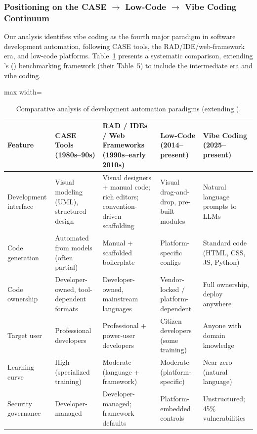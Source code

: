 \documentclass[preprint,12pt,authoryear]{elsarticle}
\begin{document}
\subsubsection{Positioning on the CASE $\rightarrow$ Low-Code $\rightarrow$ Vibe Coding Continuum}

Our analysis identifies vibe coding as the fourth major paradigm in software development automation, following CASE tools, the RAD/IDE/web-framework era, and low-code platforms. Table~\ref{tab:comparison} presents a systematic comparison, extending \citeauthor{Sanchis2020}'s (\citeyear{Sanchis2020}) benchmarking framework (their Table~5) to include the intermediate era and vibe coding.

\begin{table}[htbp]
\centering
\caption{Comparative analysis of development automation paradigms (extending \citet{Sanchis2020}).}
\label{tab:comparison}
\footnotesize
\setlength{\tabcolsep}{4pt}
\renewcommand{\arraystretch}{1.15}
\begin{adjustbox}{max width=\textwidth}
\begin{tabular}{@{}p{2.4cm}p{2.9cm}p{3.4cm}p{3.0cm}p{3.2cm}@{}}
\toprule
\textbf{Feature} & \textbf{CASE Tools (1980s--90s)} & \textbf{RAD / IDEs / Web Frameworks (1990s--early 2010s)} & \textbf{Low-Code (2014--present)} & \textbf{Vibe Coding (2025--present)} \\
\midrule
Development interface & Visual modeling (UML), structured design & Visual designers + manual code; rich editors; convention-driven scaffolding & Visual drag-and-drop, pre-built modules & Natural language prompts to LLMs \\
Code generation & Automated from models (often partial) & Manual + scaffolded boilerplate & Platform-specific configs & Standard code (HTML, CSS, JS, Python) \\
Code ownership & Developer-owned, tool-dependent formats & Developer-owned, mainstream languages & Vendor-locked / platform-dependent & Full ownership, deploy anywhere \\
Target user & Professional developers & Professional + power-user developers & Citizen developers (some training) & Anyone with domain knowledge \\
Learning curve & High (specialized training) & Moderate (language + framework) & Moderate (platform-specific) & Near-zero (natural language) \\
Security governance & Developer-managed & Developer-managed; framework defaults & Platform-embedded controls & Unstructured; 45\% vulnerabilities \\

\end{tabular}
\end{adjustbox}
\end{table}
\end{document}
